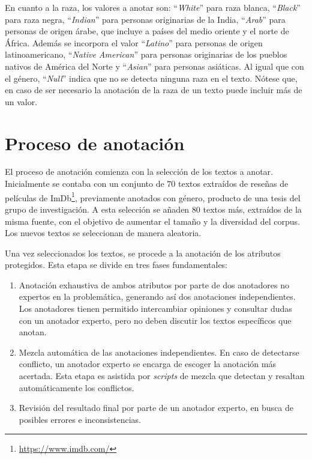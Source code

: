 En cuanto a la raza, los valores a anotar son: ``\emph{White}'' para raza blanca, ``\emph{Black}'' para raza negra, ``\emph{Indian}'' para 
personas originarias de la India, ``\emph{Arab}'' para personas de origen \'arabe, que incluye a pa\'ises del medio oriente y el norte de 
\'Africa. Adem\'as se incorpora el valor ``\emph{Latino}'' para personas de origen latinoamericano, ``\emph{Native American}'' para personas 
originarias de los pueblos nativos de Am\'erica del Norte y ``\emph{Asian}'' para personas asi\'aticas. Al igual que con el g\'enero, 
``\emph{Null}'' indica que no se detecta ninguna raza en el texto. N\'otese que, en caso de ser necesario la anotaci\'on de la raza de un 
texto puede incluir m\'as de un valor.

\section{Proceso de anotaci\'on}\label{section:annotation_process}
El proceso de anotaci\'on comienza con la selecci\'on de los textos a anotar. Inicialmente se contaba con un conjunto de $70$ textos 
extra\'idos de rese\~nas de pel\'iculas de ImDb\footnote{\url{https://www.imdb.com/}}, previamente anotados con g\'enero, producto 
de una tesis del grupo de investigaci\'on. A esta selecci\'on se a\~naden $80$ textos m\'as, extra\'idos de la misma fuente, con el 
objetivo de aumentar el tama\~no y la diversidad del corpus. Los nuevos textos se seleccionan de manera aleatoria.

Una vez seleccionados los textos, se procede a la anotaci\'on de los atributos protegidos. Esta etapa se divide en tres fases 
fundamentales:

\begin{enumerate}
    \item Anotaci\'on exhaustiva de ambos atributos por parte de dos anotadores no expertos en la problem\'atica, generando as\'i dos 
    anotaciones independientes. Los anotadores tienen permitido intercambiar opiniones y consultar dudas con un anotador experto, 
    pero no deben discutir los textos espec\'ificos que anotan.
    \item Mezcla autom\'atica de las anotaciones independientes. En caso de detectarse conflicto, un anotador experto se encarga de 
    escoger la anotaci\'on m\'as acertada. Esta etapa es asistida por \emph{scripts} de mezcla que detectan y resaltan autom\'aticamente
    los conflictos.
    \item Revisi\'on del resultado final por parte de un anotador experto, en busca de posibles errores e inconsistencias.
\end{enumerate}

